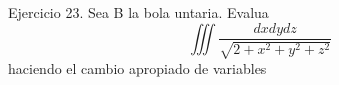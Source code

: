 Ejercicio 23.
Sea B la bola untaria. Evalua
$$
\iiint \frac{d x d y d z}{\sqrt{2+x^2+y^2+z^2}}
$$
haciendo el cambio apropiado de variables
